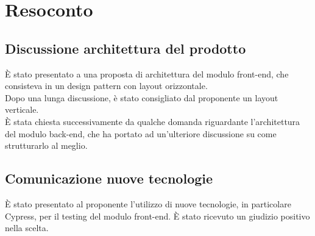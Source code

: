 \section{Resoconto}
\subsection{Discussione architettura del prodotto}

È stato presentato a \Proponente{} una proposta di architettura del modulo front-end, che consisteva in un design pattern con layout orizzontale.\\
Dopo una lunga discussione, è stato consigliato dal proponente un layout verticale.\\

È stata chiesta successivamente da \Proponente{} qualche domanda riguardante l'architettura del modulo back-end, che ha portato ad un'ulteriore discussione su come strutturarlo al meglio.

\subsection{Comunicazione nuove tecnologie}
È stato presentato al proponente l'utilizzo di nuove tecnologie, in particolare Cypress, per il testing del modulo front-end. È stato ricevuto un giudizio positivo nella scelta.
